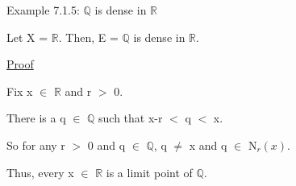{ \color{purple} Example 7.1.5: $\mathbb{Q}$ is dense in $\mathbb{R}$ } 

	\qquad Let X = $\mathbb{R}$.
	Then, E = $\mathbb{Q}$ is dense in $\mathbb{R}$.

{ \color{magenta} \underline{Proof} } 

	Fix x $\in$ $\mathbb{R}$ and r $>$ 0.

	There is a q $\in$ $\mathbb{Q}$ such that x-r $<$ q $<$ x.

	So for any r $>$ 0 and q $\in$ $\mathbb{Q}$, q $\neq$ x and
	q $\in$ N$_r(x)$.

	Thus, every x $\in$ $\mathbb{R}$ is a limit point of $\mathbb{Q}$. \\





































